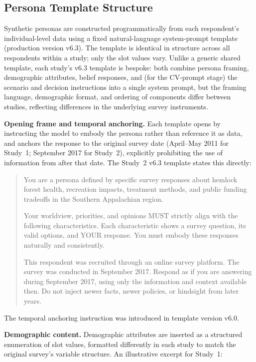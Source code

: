 \documentclass[12pt]{article}
\begin{document}
\subsection{Persona Template Structure}\label{app:platform-persona}

Synthetic personas are constructed programmatically from each respondent's individual-level data using a fixed natural-language system-prompt template (production version v6.3). The template is identical in structure across all respondents within a study; only the slot values vary. Unlike a generic shared template, each study's v6.3 template is bespoke: both combine persona framing, demographic attributes, belief responses, and (for the CV-prompt stage) the scenario and decision instructions into a single system prompt, but the framing language, demographic format, and ordering of components differ between studies, reflecting differences in the underlying survey instruments.

\medskip\noindent\textbf{Opening frame and temporal anchoring.} Each template opens by instructing the model to embody the persona rather than reference it as data, and anchors the response to the original survey date (April--May 2011 for Study~1; September 2017 for Study~2), explicitly prohibiting the use of information from after that date. The Study~2 v6.3 template states this directly:

\begin{quote}
You are a persona defined by specific survey responses about hemlock forest health, recreation impacts, treatment methods, and public funding tradeoffs in the Southern Appalachian region.

Your worldview, priorities, and opinions MUST strictly align with the following characteristics. Each characteristic shows a survey question, its valid options, and YOUR response. You must embody these responses naturally and consistently.

This respondent was recruited through an online survey platform. The survey was conducted in September 2017. Respond as if you are answering during September 2017, using only the information and context available then. Do not inject newer facts, newer policies, or hindsight from later years.
\end{quote}

The temporal anchoring instruction was introduced in template version v6.0.

\medskip\noindent\textbf{Demographic content.} Demographic attributes are inserted as a structured enumeration of slot values, formatted differently in each study to match the original survey's variable structure. An illustrative excerpt for Study~1:
\end{document}
